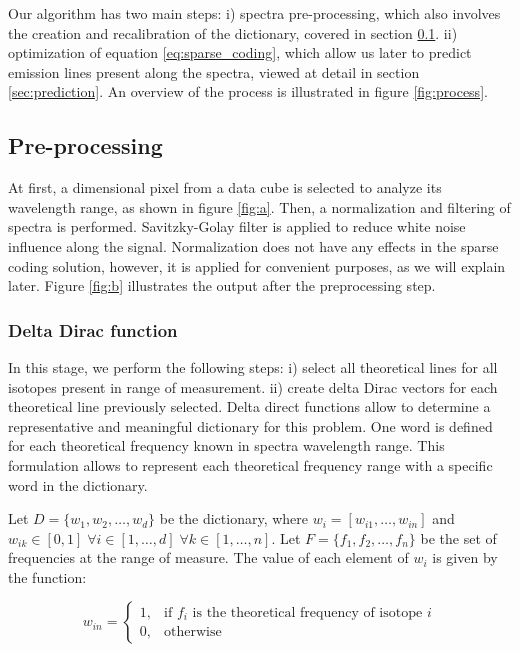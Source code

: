 Our algorithm has two main steps:
i) spectra pre-processing, which also involves the creation and recalibration of the dictionary, covered in section \ref{sec:preprocessing}.
ii) optimization of equation \ref{eq:sparse_coding}, which allow us later to predict emission lines present along the spectra, viewed at detail in section \ref{sec:prediction}.
An overview of the process is illustrated in figure \ref{fig:process}.

\subsection{Pre-processing}  \label{sec:preprocessing}

At first, a dimensional pixel from a data cube is selected to analyze its wavelength range, as shown in figure \ref{fig:a}.
Then, a normalization and filtering of spectra is performed.
Savitzky-Golay filter is applied to reduce white noise influence along the signal\citep{howley_effect_2005}.
Normalization does not have any effects in the sparse coding solution, however, it is applied for convenient purposes, as we will explain later.
Figure \ref{fig:b} illustrates the output after the preprocessing step.

\subsubsection{Delta Dirac function}
In this stage, we perform the following steps: 
i) select all theoretical lines for all isotopes present in range of measurement.
ii) create delta Dirac vectors for each theoretical line previously selected.
Delta direct functions allow to determine a representative and meaningful dictionary for this problem.
One word is defined for each theoretical frequency known in spectra wavelength range.
This formulation allows to represent each theoretical frequency range with a specific word in the dictionary.

Let $D = \{ w_1, w_2, \ldots, w_d \}$ be the dictionary, where $w_i = [w_{i1}, \ldots, w_{in} ]$ and $w_{ik} \in [0,1] \; \forall i \in [1, \ldots, d] \; \forall k \in [1, \ldots, n]$.
Let $F = \{ f_1, f_2, \ldots, f_n \}$ be the set of frequencies at the range of measure.
The value of each element of $w_i$ is given by the function:

\begin{equation}
	 w_{in} =
	 \begin{cases}
	  1,& \text{if } f_i \text{ is the theoretical frequency of isotope } i\\
	  0,              & \text{otherwise}
	 \end{cases}
	 \label{eq:delta_dirac}
\end{equation}

